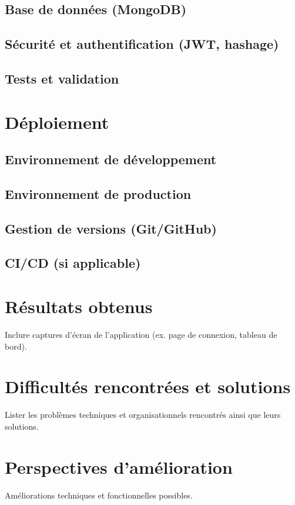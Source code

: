 \documentclass[12pt,a4paper]{report}
\begin{document}
\section{Base de données (MongoDB)}
\section{Sécurité et authentification (JWT, hashage)}
\section{Tests et validation}

\chapter{Déploiement}
\section{Environnement de développement}
\section{Environnement de production}
\section{Gestion de versions (Git/GitHub)}
\section{CI/CD (si applicable)}

\chapter{Résultats obtenus}
Inclure captures d’écran de l’application (ex. page de connexion, tableau de bord).  

\chapter{Difficultés rencontrées et solutions}
Lister les problèmes techniques et organisationnels rencontrés ainsi que leurs solutions.  

\chapter{Perspectives d’amélioration}
Améliorations techniques et fonctionnelles possibles.  
\end{document}
